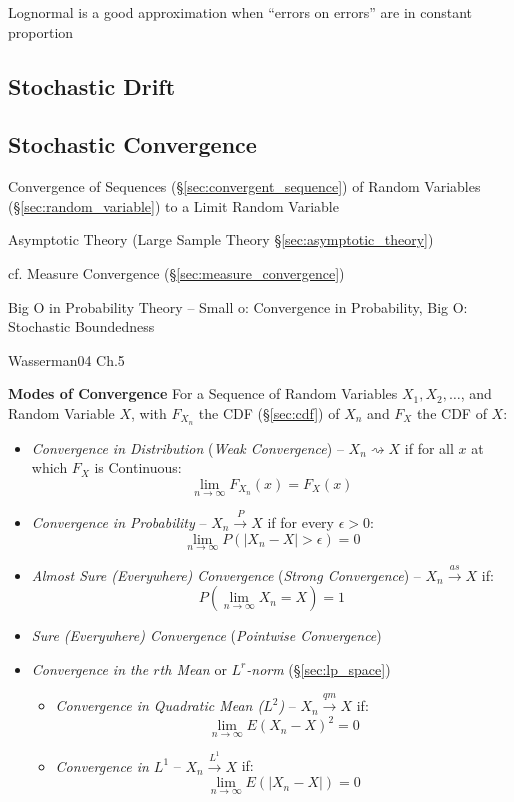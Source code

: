 Lognormal is a good approximation when ``errors on errors'' are in constant
proportion



\subsection{Stochastic Drift}\label{sec:stochastic_drift}

\subsection{Stochastic Convergence}\label{sec:stochastic_convergence}

Convergence of Sequences (\S\ref{sec:convergent_sequence}) of Random Variables
(\S\ref{sec:random_variable}) to a Limit Random Variable

\fist Asymptotic Theory (Large Sample Theory \S\ref{sec:asymptotic_theory})

\fist cf. Measure Convergence (\S\ref{sec:measure_convergence})

Big O in Probability Theory -- Small o: Convergence in Probability, Big O:
Stochastic Boundedness

Wasserman04 Ch.5

\textbf{Modes of Convergence}
For a Sequence of Random Variables $X_1, X_2, \ldots$, and Random Variable $X$,
with $F_{X_n}$ the CDF (\S\ref{sec:cdf}) of $X_n$ and $F_X$ the CDF of $X$:
\begin{itemize}
  \item \emph{Convergence in Distribution} (\emph{Weak Convergence}) --
    $X_n \rightsquigarrow X$ if for all $x$ at which $F_X$ is Continuous:
    \[
      \lim_{n\to\infty} F_{X_n}(x) = F_X(x)
    \]
  \item \emph{Convergence in Probability} -- $X_n \xrightarrow{P} X$ if for
    every $\epsilon > 0$:
    \[
      \lim_{n\to\infty}P(|X_n - X| > \epsilon) = 0
    \]
  \item \emph{Almost Sure (Everywhere) Convergence} (\emph{Strong Convergence})
    -- $X_n \xrightarrow{as} X$ if:
    \[
      P(\lim_{n\to\infty}X_n = X) = 1
    \]
  \item \emph{Sure (Everywhere) Convergence} (\emph{Pointwise Convergence})
  \item \emph{Convergence in the $r$th Mean} or \emph{$L^r$-norm}
    (\S\ref{sec:lp_space})
    \begin{itemize}
      \item \emph{Convergence in Quadratic Mean ($L^2$)} --
        $X_n \xrightarrow{qm} X$ if:
        \[
          \lim_{n\to\infty} E(X_n - X)^2 = 0
        \]
      \item \emph{Convergence in $L^1$} -- $X_n \xrightarrow{L^1} X$ if:
        \[
          \lim_{n\to\infty} E(|X_n - X|) = 0
        \]
    \end{itemize}
\end{itemize}

